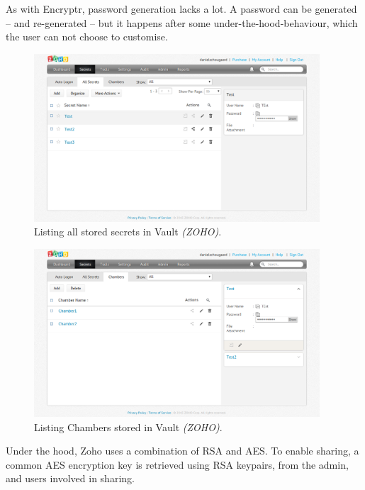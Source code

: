 			As with Encryptr, password generation lacks a lot. A password can be generated -- and re-generated -- but it happens after some under-the-hood-behaviour, which the user can not choose to customise.


			\begin{figure}[htbp]
				\centering
				\includegraphics[width=0.95\textwidth]{figures/analysis/vaultzoho_main_secrets.png}
				\caption{Listing all stored secrets in Vault \emph{(ZOHO)}.}
				\label{fig:vaultzoho_main_secrets}
			\end{figure}

			\begin{figure}[htbp]
				\centering
				\includegraphics[width=0.95\textwidth]{figures/analysis/vaultzoho_main_chambers.png}
				\caption{Listing Chambers stored in Vault \emph{(ZOHO)}.}
				\label{fig:vaultzoho_main_chambers}
			\end{figure}


			Under the hood, Zoho uses a combination of RSA and AES. To enable sharing, a common AES encryption key is retrieved using RSA keypairs, from the admin, and users involved in sharing\cite{vault_zoho_encryption}.

